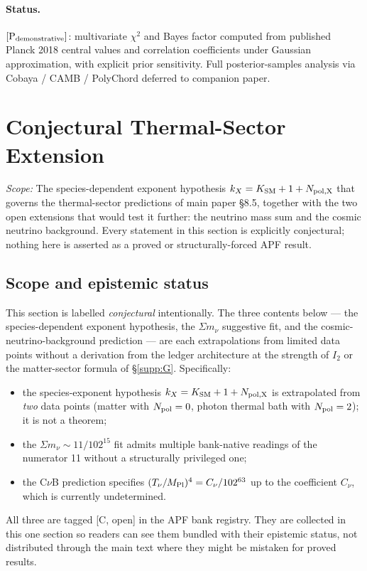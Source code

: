 \documentclass[11pt]{article}
\theoremstyle{plain}
\theoremstyle{definition}
\theoremstyle{remark}
\newcommand{\Mpl}{M_{\rm Pl}}
\begin{document}
\paragraph{Status.}  $[\text{P}_{\rm demonstrative}]$: multivariate $\chi^2$ and Bayes factor computed from published Planck 2018 central values and correlation coefficients under Gaussian approximation, with explicit prior sensitivity.  Full posterior-samples analysis via Cobaya / CAMB / PolyChord deferred to companion paper.

\section{Conjectural Thermal-Sector Extension}\label{supp:J}

\noindent\textit{Scope:} The species-dependent exponent hypothesis $k_X = K_{\rm SM} + 1 + N_{\rm pol,X}$ that governs the thermal-sector predictions of main paper \S8.5, together with the two open extensions that would test it further: the neutrino mass sum and the cosmic neutrino background.  Every statement in this section is explicitly conjectural; nothing here is asserted as a proved or structurally-forced APF result.

\bigskip

\subsection{Scope and epistemic status}\label{supp:J0}

This section is labelled \emph{conjectural} intentionally.  The three contents below --- the species-dependent exponent hypothesis, the $\Sigma m_\nu$ suggestive fit, and the cosmic-neutrino-background prediction --- are each extrapolations from limited data points without a derivation from the ledger architecture at the strength of $I_2$ or the matter-sector formula of \S\ref{supp:G}.  Specifically:
\begin{itemize}[leftmargin=2em,itemsep=2pt]
  \item the species-exponent hypothesis $k_X = K_{\rm SM} + 1 + N_{\rm pol,X}$ is extrapolated from \emph{two} data points (matter with $N_{\rm pol} = 0$, photon thermal bath with $N_{\rm pol} = 2$); it is not a theorem;
  \item the $\Sigma m_\nu \sim 11/102^{15}$ fit admits multiple bank-native readings of the numerator 11 without a structurally privileged one;
  \item the C$\nu$B prediction specifies $(T_\nu / \Mpl)^4 = C_\nu / 102^{63}$ up to the coefficient $C_\nu$, which is currently undetermined.
\end{itemize}
All three are tagged [C, open] in the APF bank registry.  They are collected in this one section so readers can see them bundled with their epistemic status, not distributed through the main text where they might be mistaken for proved results.
\end{document}
